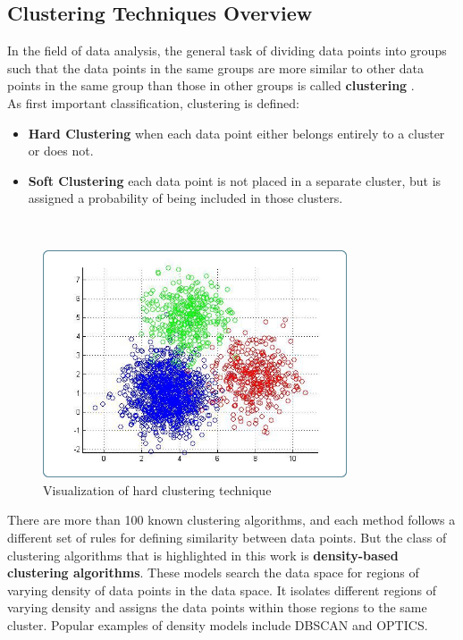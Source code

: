     \subsection{Clustering Techniques Overview}
    In the field of data analysis, the general task of dividing data points into groups such that the data points in the same groups are more similar to other data points in the same group than those in other groups is called \textbf{clustering} \cite{clustering}.
    \\
    As first important classification, clustering is defined:
    
    \begin{itemize}
    \item \textbf{Hard Clustering} when each data point either belongs entirely to a cluster or does not.
    \item \textbf{Soft Clustering} each data point is not placed in a separate cluster, but is assigned a probability of being included in those clusters.
    \end{itemize}
    \\
    \begin{figure}[H]
        \centering
        \includegraphics[width=9cm]{Images/1/clustering.png}
        \caption{Visualization of hard clustering technique}
    \end{figure}
        
    
    There are more than 100 known clustering algorithms, and each method follows a different set of rules for defining similarity between data points. But the class of clustering algorithms that is highlighted in this work is \textbf{density-based clustering algorithms}. These models search the data space for regions of varying density of data points in the data space. It isolates different regions of varying density and assigns the data points within those regions to the same cluster. Popular examples of density models include DBSCAN and OPTICS.
    
